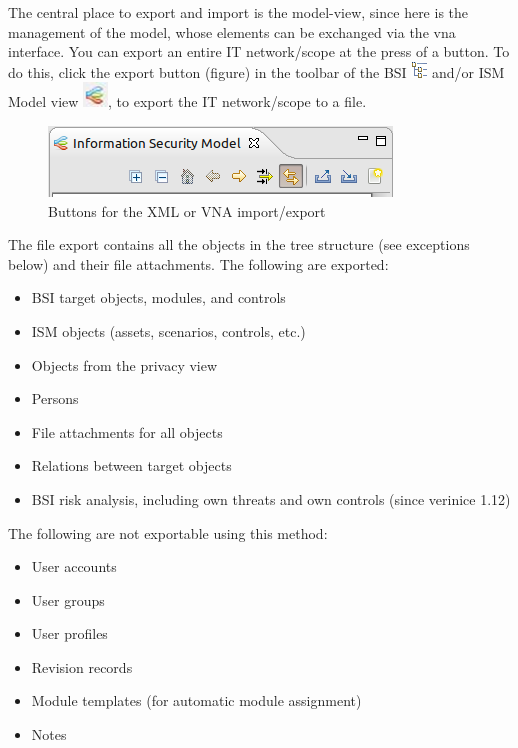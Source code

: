 \documentclass[a4paper,10pt]{book}
\begin{document}
The central place to export and import is the model-view, since here is the management of the model, whose elements can be exchanged via the vna interface. You can export an entire IT network/scope at the press of a button. To do this, click the export button (figure) in the
toolbar of the BSI \includegraphics[height=2ex]{Icon/GS_Modell.png} and/or ISM Model view \includegraphics[height=2ex]{Icon/Informationssicherheitsmodell.png},
to export the IT network/scope to a file.
\newline
\begin{figure}[htb!]
  \centering
  \includegraphics[scale=.7]{Screenshot/Import-export_buttons-en.png}
  \caption{\label{fig:buttons-xml-vna-import} Buttons for the XML or VNA import/export}
\end{figure}
\newline
The file export contains all the objects in the tree structure (see exceptions below) and their file attachments.
The following are exported:
\begin{itemize}
 \item BSI target objects, modules, and controls
 \item ISM objects (assets, scenarios, controls, etc.)
 \item Objects from the privacy view
 \item Persons
 \item File attachments for all objects
 \item Relations between target objects
 \item BSI risk analysis, including own threats and own controls
   (since verinice 1.12)
\end{itemize}
The following are not exportable using this method:
\begin{itemize}
 \item User accounts
 \item User groups
 \item User profiles
 \item Revision records
 \item Module templates (for automatic module assignment)
 \item Notes
\end{itemize}
\end{document}

